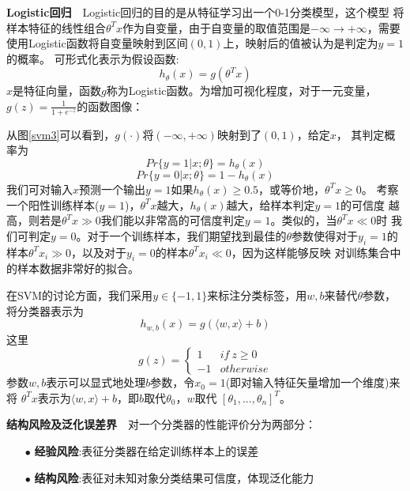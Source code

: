 
\textbf{Logistic回归}~~Logistic回归的目的是从特征学习出一个0-1分类模型，这个模型
将样本特征的线性组合$\theta^Tx$作为自变量，由于自变量的取值范围是$-\infty\to+\infty$，需要
使用Logistic函数将自变量映射到区间$(0,1)$上，映射后的值被认为是判定为$y=1$的概率。
可形式化表示为假设函数:
\begin{equation}
    h_\theta(x)=g(\theta^Tx)
\end{equation}
$x$是特征向量，函数$g$称为Logistic函数。为增加可视化程度，对于一元变量，
$g(z)=\frac{1}{1+e^{-z}}$的函数图像：

从图\ref{svm3}可以看到，$g(\cdot)$将$(-\infty,+\infty)$映射到了$(0,1)$，给定$x$，
其判定概率为
\begin{equation}
    Pr\{y=1|x;\theta\}=h_\theta(x)
\end{equation}
\begin{equation}
    Pr\{y=0|x;\theta\}=1-h_\theta(x)
\end{equation}
我们可对输入$x$预测一个输出$y=1$如果$h_\theta(x)\geq0.5$，或等价地，$\theta^Tx\geq0$。
考察一个阳性训练样本($y=1$)，$\theta^Tx$越大，$h_\theta(x)$越大，给样本判定$y=1$的可信度
越高，则若是$\theta^Tx\gg0$我们能以非常高的可信度判定$y=1$。类似的，当$\theta^Tx\ll0$时
我们可判定$y=0$。对于一个训练样本，我们期望找到最佳的$\theta$参数使得对于$y_i=1$的
样本$\theta^Tx_i\gg0$，以及对于$y_i=0$的样本$\theta^Tx_i\ll0$，因为这样能够反映
对训练集合中的样本数据非常好的拟合。

在SVM的讨论方面，我们采用$y\in\{-1,1\}$来标注分类标签，用$w,b$来替代$\theta$参数，
将分类器表示为
\begin{equation}
    h_{w,b}(x)=g(\langle{}w,x\rangle+b)
\end{equation}
这里
\begin{equation}
g(z)=\left\{\begin{array}{ll}
    1&if~z\geq0\\
    -1&otherwise
    \end{array}\right.
\end{equation}
参数$w,b$表示可以显式地处理$b$参数，令$x_0=1$(即对输入特征矢量增加一个维度)来将
$\theta^Tx$表示为$\langle{}w,x\rangle+b$，即$b$取代$\theta_0$，$w$取代
$[\theta_1,...,\theta_n]^T$。

\textbf{结构风险及泛化误差界}~~对一个分类器的性能评价分为两部分：
\begin{enumerate}
    \item[$\bullet$] \textbf{经验风险}:表征分类器在给定训练样本上的误差
    \item[$\bullet$] \textbf{结构风险}:表征对未知对象分类结果可信度，体现泛化能力
\end{enumerate}

